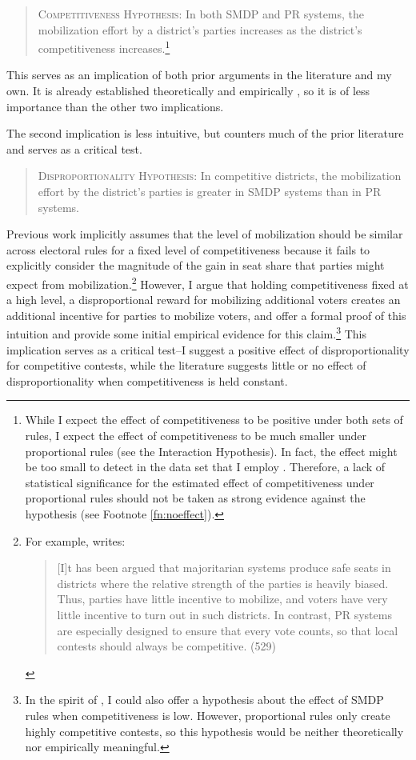 \documentclass[12pt]{article}
\begin{document}
\begin{quote}
\textsc{Competitiveness Hypothesis}: In both SMDP and PR systems, the mobilization effort by a district's parties increases as the district's competitiveness increases.\footnote{While I expect the effect of competitiveness to be positive under both sets of rules, I expect the effect of competitiveness to be much smaller under proportional rules (see the Interaction Hypothesis). In fact, the effect might be too small to detect in the data set that I employ \citep{Rainey2014}. Therefore, a lack of statistical significance for the estimated effect of competitiveness under proportional rules should not be taken as strong evidence against the hypothesis (see Footnote \ref{fn:noeffect}).}
\end{quote}

\noindent This serves as an implication of both prior arguments in the literature and my own. It is already established theoretically \citep[e.g.][]{Cox1999b} and empirically \citep[e.g.][]{CoxMunger1989}, so it is of less importance than the other two implications.

The second implication is less intuitive, but counters much of the prior literature and serves as a critical test.

\begin{quote}
\textsc{Disproportionality Hypothesis}: In competitive districts, the mobilization effort by the district's parties is greater in SMDP systems than in PR systems.
\end{quote}

\noindent Previous work implicitly assumes that the level of mobilization should be similar across electoral rules for a fixed level of competitiveness because it fails to explicitly consider the magnitude of the gain in seat share that parties might expect from mobilization.\footnote{For example, \cite{Selb2009} writes: \begin{quote} [I]t has been argued that majoritarian systems produce safe seats in districts where the relative strength of the parties is heavily biased. Thus, parties have little incentive to mobilize, and voters have very little incentive to turn out in such districts. In contrast, PR systems are especially designed to ensure that every vote counts, so that local contests should always be competitive. (529)\end{quote}} However, I argue that holding competitiveness fixed at a high level, a disproportional reward for mobilizing additional voters creates an additional incentive for parties to mobilize voters, and \cite{HerreraMorelliPalfrey2013} offer a formal proof of this intuition and \cite{KarpBanducciBowler2007} provide some initial empirical evidence for this claim.\footnote{In the spirit of \cite{BerryGolderMilton2012}, I could also offer a hypothesis about the effect of SMDP rules when competitiveness is low. However, proportional rules only create highly competitive contests, so this hypothesis would be neither theoretically nor empirically meaningful.} This implication serves as a critical test--I suggest a positive effect of disproportionality for competitive contests, while the literature suggests little or no effect of disproportionality when competitiveness is held constant.
\end{document}
